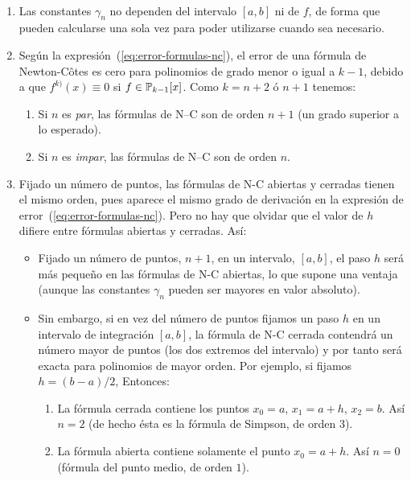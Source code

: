 \begin{remark}~
  \label{rk:7}
  \begin{enumerate}
  \item Las constantes $\gamma_n$ no dependen del intervalo $[a,b]$ ni
    de $f$, de forma que pueden calcularse una sola vez para poder
    utilizarse cuando sea necesario.
  \item Según la expresión~(\ref{eq:error-formulas-nc}), el error de
    una fórmula de Newton-Côtes es cero para polinomios de grado menor
    o igual a $k-1$, debido a que $f^{k)}(x)\equiv 0$ si
    $f\in\operatorname{{\mathbb P}}_{k-1}[x]$. Como $k=n+2$ ó $n+1$ tenemos:
    \begin{enumerate}
    \item Si $n$ es \textit{par}, las fórmulas de N--C son de 
      orden $n+1$ (un grado superior a lo esperado).
    \item Si $n$ es \textit{impar}, las fórmulas de N--C son de 
      orden $n$.
    \end{enumerate}
  \item Fijado un número de puntos, las fórmulas de N-C abiertas y
    cerradas tienen el mismo orden, pues aparece el mismo grado de
    derivación en la expresión de
    error~(\ref{eq:error-formulas-nc}). Pero no hay que olvidar que el
    valor de $h$ difiere entre fórmulas abiertas y cerradas. Así:
    \begin{itemize}
    \item Fijado un número de puntos, $n+1$, en un intervalo,
      $[a,b]$, el paso $h$ será más pequeño en las fórmulas de N-C
      abiertas, lo que supone una ventaja (aunque las constantes
      $\gamma_n$ pueden ser mayores en valor absoluto).
    \item Sin embargo, si en vez del número de puntos fijamos un paso
      $h$ en un intervalo de integración $[a,b]$, la fórmula de N-C
      cerrada contendrá un número mayor de puntos (los dos extremos
      del intervalo) y por tanto será exacta para polinomios de mayor
      orden. Por ejemplo, si fijamos $h=(b-a)/2$, Entonces:
      \begin{enumerate}
      \item La fórmula cerrada contiene los puntos $x_0=a$, $x_1=a+h$,
        $x_2=b$. Así $n=2$ (de hecho ésta es la fórmula de Simpson, de
        orden $3$).
      \item La fórmula abierta contiene solamente el punto $x_0=a+h$.
        Así $n=0$ (fórmula del punto medio, de orden $1$).
      \end{enumerate}
    \end{itemize}
 

\end{enumerate}
\end{remark}
